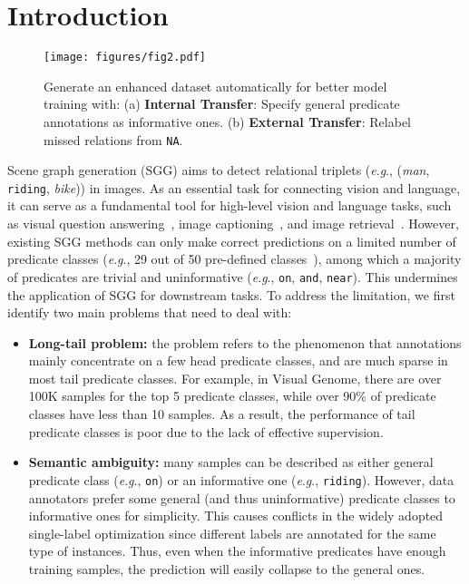 \documentclass[runningheads]{llncs}
\newcommand{\eg}{\textit{e}.\textit{g}.}
\begin{document}
\section{Introduction}

\begin{figure}[t]
    \centering
    \texttt{[image: figures/fig2.pdf]}
    \caption{Generate an enhanced dataset automatically for better model training with: (a) \textbf{Internal Transfer}: Specify general predicate annotations as informative ones. (b) \textbf{External Transfer}: Relabel missed relations from \texttt{NA}.}
    \label{fig:example}
\end{figure}


Scene graph generation (SGG) aims to detect relational triplets (\eg, (\textit{man}, \texttt{riding}, \textit{bike})) in images. 
As an essential task for connecting vision and language, it can serve as a fundamental tool for high-level vision and language tasks, such as visual question answering~\cite{vqa2015antol,sggforvqa2017teney,xiao2022video,li2022invariant}, image captioning~\cite{auto2019yang,unpaired2019gu}, and image retrieval~\cite{imrt2015johnson,cross2020wang,wei2022rethinking}. However, existing SGG methods can only make correct predictions on a limited number of predicate classes (\eg, 29 out of 50 pre-defined classes~\cite{zellers2018motif}), among which a majority of predicates are trivial and uninformative (\eg, \texttt{on}, \texttt{and}, \texttt{near}).
This undermines the application of SGG for downstream tasks.
To address the limitation, we first identify two main problems that need to deal with:

\begin{itemize}
    \item[] \textbf{Long-tail problem:} the problem refers to the phenomenon that annotations mainly concentrate on a few head predicate classes, and are much sparse in most tail predicate classes. For example, in Visual Genome\cite{krishna2017visual}, there are over 100K samples for the top 5 predicate classes, while over 90\% of predicate classes have less than 10 samples. As a result, the performance of tail predicate classes is poor due to the lack of effective supervision.
    \item[] \textbf{Semantic ambiguity:} many samples can be described as either general predicate class (\eg, \texttt{on}) or an informative one (\eg, \texttt{riding}). However, data annotators prefer some general (and thus uninformative) predicate classes to informative ones for simplicity. This causes conflicts in the widely adopted single-label optimization since different labels are annotated for the same type of instances. Thus, even when the informative predicates have enough training samples, the prediction will easily collapse to the general ones.
\end{itemize}
\end{document}
